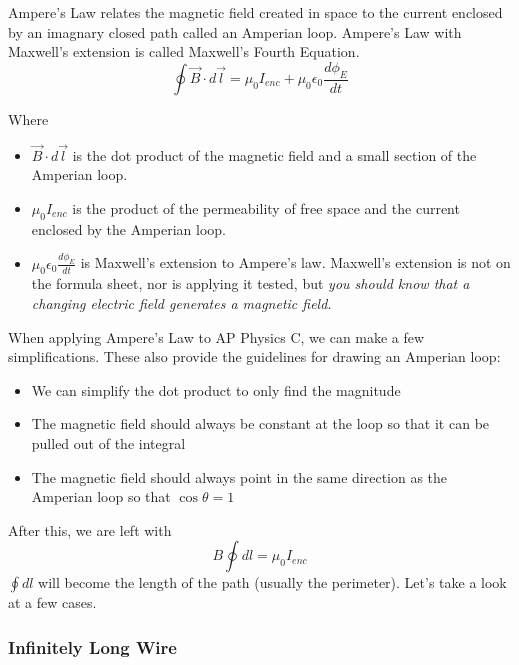 \documentclass[12pt, titlepage]{article}
\begin{document}
Ampere's Law relates the magnetic field created in space to the current enclosed by an imagnary closed path called an Amperian loop. Ampere's Law with Maxwell's extension is called Maxwell's Fourth Equation.
\begin{equation*}
    \oint \vec{B} \cdot d\vec{l}= \mu_0I_{enc} + \mu_0\epsilon_0\frac{d\phi_E}{dt}
\end{equation*}
\begin{minipage}{\textwidth}
Where
\begin{itemize}
    \item $\vec{B} \cdot d\vec{l}$ is the dot product of the magnetic field and a small section of the Amperian loop.
    \item $\mu_0I_{enc}$ is the product of the permeability of free space and the current enclosed by the Amperian loop.
    \item $\mu_0\epsilon_0\frac{d\phi_E}{dt}$ is Maxwell's extension to Ampere's law. Maxwell's extension is not on the formula sheet, nor is applying it tested, but \textit{you should know that a changing electric field generates a magnetic field.}
\end{itemize}
\end{minipage}

When applying Ampere's Law to AP Physics C, we can make a few simplifications. These also provide the guidelines for drawing an Amperian loop:
\begin{itemize}
    \item We can simplify the dot product to only find the magnitude
    \item The magnetic field should always be constant at the loop so that it can be pulled out of the integral
    \item The magnetic field should always point in the same direction as the Amperian loop so that $\cos\theta=1$
\end{itemize}
After this, we are left with 
\begin{equation*}
    B \oint dl = \mu_0I_{enc}
\end{equation*}
$\oint dl$ will become the length of the path (usually the perimeter). Let's take a look at a few cases.

\subsubsection*{Infinitely Long Wire}
\end{document}
